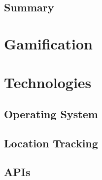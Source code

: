



\subsection{Summary}

\section{Gamification}



\section{Technologies}
%
\subsection{Operating System}
%
%
%

\subsection{Location Tracking}


\subsection{APIs}
